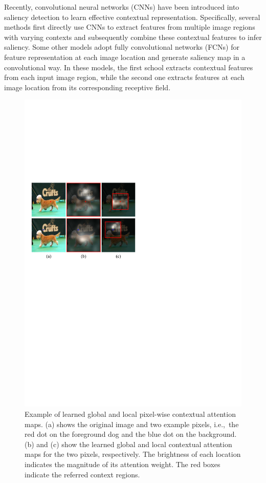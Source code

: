 \documentclass[10pt,twocolumn,letterpaper]{article}
\def\ie{i.e.,~} %
\begin{document}
Recently, convolutional neural networks (CNNs) have been introduced into saliency detection to learn effective contextual representation.
%
Specifically, several methods \cite{li2015mdf,liu2015mrcnn,zhao2015mcdl} first directly use CNNs to extract features from multiple image regions with varying contexts and subsequently combine these contextual features to infer saliency. Some other models \cite{kuen2016recurrent,li2016dcl,liu2016dhsnet,liu2016dsclrcn,wang2016rfcn,hou2017dss,luo2017nldf,Zhang2017amulet,Zhang2017ucf,Wang2017srm} adopt fully convolutional networks (FCNs) \cite{long2015fcn} for feature representation at each image location and generate saliency map in a convolutional way.
%
In these models, the first school extracts contextual features from each input image region, while the second one extracts features at each image location from its corresponding receptive field.
\begin{figure}[!t]
  \graphicspath{{Figures/figure1/}}
  \centering
  \includegraphics[width=0.8\linewidth]{figure1.pdf}
  \caption{Example of learned global and local pixel-wise contextual attention maps. (a) shows the original image and two example pixels, \ie the red dot on the foreground dog and the blue dot on the background. (b) and (c) show the learned global and local contextual attention maps for the two pixels, respectively. The brightness of each location indicates the magnitude of its attention weight. The red boxes indicate the referred context regions.}
  \label{figure1}
  \vspace{-0.5cm}
\end{figure}
\end{document}
